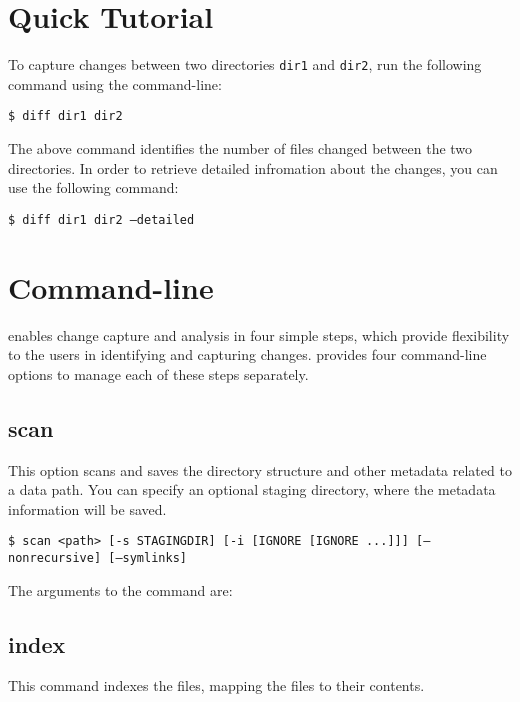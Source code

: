 
\section{Quick Tutorial}
To capture changes between two directories \texttt{dir1}
and \texttt{dir2}, run the following command using the \systemname
command-line:

\texttt{\$ \appcmd diff dir1 dir2}

The above command identifies the number of files changed
between the two directories. In order to retrieve detailed
infromation about the changes, you can use the following
command:

\texttt{\$ \appcmd diff dir1 dir2 --detailed}

\section{Command-line}
\systemname enables change capture and analysis in four
simple steps, which provide flexibility to the users in
identifying and capturing changes. \systemname provides
four command-line options to manage each of these steps
separately.

\subsection{scan}
This option scans and saves the directory structure and
other metadata related to a data path. You can specify
an optional staging directory, where the metadata information
will be saved.

\texttt{\$ \appcmd scan <path> [-s STAGINGDIR] [-i [IGNORE [IGNORE ...]]] [--nonrecursive] [--symlinks]}

The arguments to the command are:


\subsection{index}
This command indexes the files, mapping the files to their contents. 

